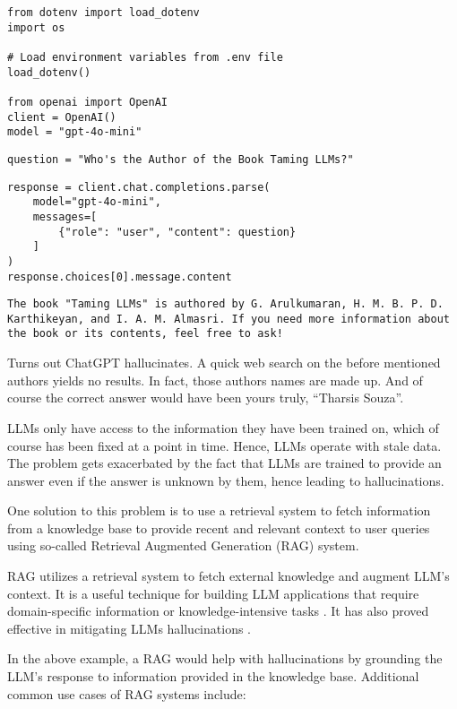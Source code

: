 \begin{verbatim}
from dotenv import load_dotenv
import os

# Load environment variables from .env file
load_dotenv()

from openai import OpenAI
client = OpenAI()
model = "gpt-4o-mini"
\end{verbatim}

\begin{verbatim}
question = "Who's the Author of the Book Taming LLMs?"
\end{verbatim}

\begin{verbatim}
response = client.chat.completions.parse(
    model="gpt-4o-mini",
    messages=[
        {"role": "user", "content": question}
    ]
)
response.choices[0].message.content
\end{verbatim}
\begin{verbatim}
The book "Taming LLMs" is authored by G. Arulkumaran, H. M. B. P. D. Karthikeyan, and I. A. M. Almasri. If you need more information about the book or its contents, feel free to ask!
\end{verbatim}


Turns out ChatGPT hallucinates. A quick web search on the before mentioned authors yields no results. In fact, those authors names are made up. And of course the correct answer would have been yours truly, ``Tharsis Souza''.

LLMs only have access to the information they have been trained on, which of course has been fixed at a point in time. Hence, LLMs operate with stale data. The problem gets exacerbated by the fact that LLMs are trained to provide an answer even if the answer is unknown by them, hence leading to hallucinations. 

One solution to this problem is to use a retrieval system to fetch information from a knowledge base to provide recent and relevant context to user queries using so-called Retrieval Augmented Generation (RAG) system.

RAG utilizes a retrieval system to fetch external knowledge and augment LLM's context. It is a useful technique for building LLM applications that require domain-specific information or knowledge-intensive tasks . It has also proved effective in mitigating LLMs hallucinations .

In the above example, a RAG would help with hallucinations by grounding the LLM's response to information provided in the knowledge base. Additional common use cases of RAG systems include:

